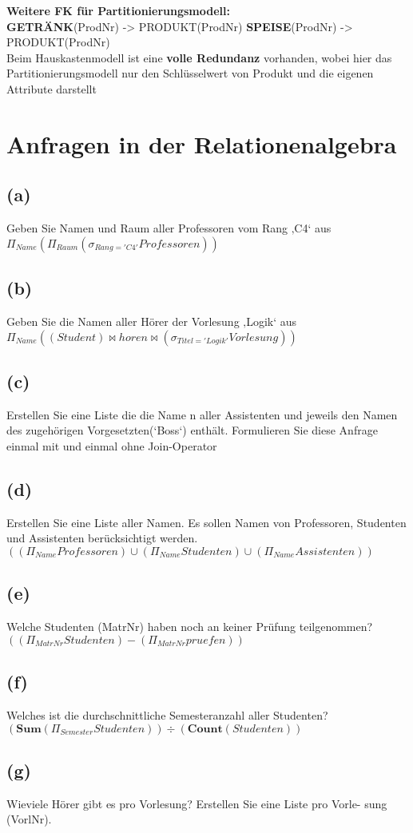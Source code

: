 \documentclass{article}
\begin{document}
\textbf{Weitere FK für Partitionierungsmodell:}\\
\textbf{GETRÄNK}(ProdNr) -> PRODUKT(ProdNr)
\textbf{SPEISE}(ProdNr) -> PRODUKT(ProdNr)\\

Beim Hauskastenmodell ist eine \textbf{volle Redundanz} vorhanden, wobei hier das Partitionierungsmodell
nur den Schlüsselwert von Produkt und die eigenen Attribute darstellt

\section{Anfragen in der Relationenalgebra}
\subsection{(a)}
Geben Sie Namen und Raum aller Professoren vom Rang ‚C4‘ aus\\
$\Pi_{Name} (\Pi_{Raum}(\sigma_{Rang='C4'} Professoren))$ \\

\subsection{(b)}
Geben Sie die Namen aller Hörer der Vorlesung ‚Logik‘ aus
$\Pi_{Name}((Student) \bowtie horen \bowtie (\sigma_{Titel='Logik'}Vorlesung))$ \\

\subsection{(c)}
Erstellen Sie eine Liste die die Name n aller Assistenten und jeweils den
Namen des zugehörigen Vorgesetzten(‘Boss‘) enthält. Formulieren Sie diese Anfrage einmal mit und einmal 
ohne Join-Operator\\


\subsection{(d)}
Erstellen Sie eine Liste aller Namen. Es sollen Namen von Professoren,
Studenten und Assistenten berücksichtigt werden. \\
$((\Pi_{Name} Professoren) \cup (\Pi_{Name} Studenten) \cup (\Pi_{Name} Assistenten))$

\subsection{(e)}
Welche Studenten (MatrNr) haben noch an keiner Prüfung teilgenommen?\\
$((\Pi_{MatrNr} Studenten) - (\Pi_{MatrNr} pruefen))$\\

\subsection{(f)}
Welches ist die durchschnittliche Semesteranzahl aller Studenten?\\
$(\textbf{Sum}(\Pi_{Semester} Studenten)) \div  (\textbf{Count}(Studenten))$\\

\subsection{(g)}
Wieviele Hörer gibt es pro Vorlesung? Erstellen Sie eine Liste pro Vorle-
sung (VorlNr).\\
$ $
\end{document}
